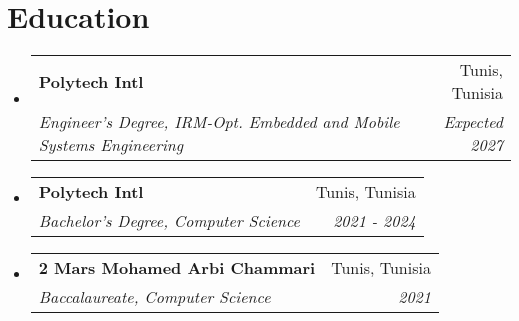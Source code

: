 \documentclass[letterpaper,11pt]{article}
\makeatletter
\newcommand{\resumeSubheading}[4]{
  \vspace{-2pt}\item
    \begin{tabular*}{0.97\textwidth}[t]{l@{\extracolsep{\fill}}r}
      \textbf{#1} & #2 \\
      \textit{\small#3} & \textit{\small #4} \\
    \end{tabular*}\vspace{-7pt}
}
\newcommand{\resumeSubHeadingListStart}{\begin{itemize}[leftmargin=0.15in, label={}]}
\newcommand{\resumeSubHeadingListEnd}{\end{itemize}}
\makeatother
\begin{document}
\section{Education}
\resumeSubHeadingListStart
\resumeSubheading
{Polytech Intl}{Tunis, Tunisia}
{Engineer's Degree, IRM-Opt. Embedded and Mobile Systems Engineering}{Expected 2027}

\resumeSubheading
{Polytech Intl}{Tunis, Tunisia}
{Bachelor's Degree, Computer Science}{2021 - 2024}

\resumeSubheading
{2 Mars Mohamed Arbi Chammari}{Tunis, Tunisia}
{Baccalaureate, Computer Science}{2021}

\resumeSubHeadingListEnd
\end{document}
